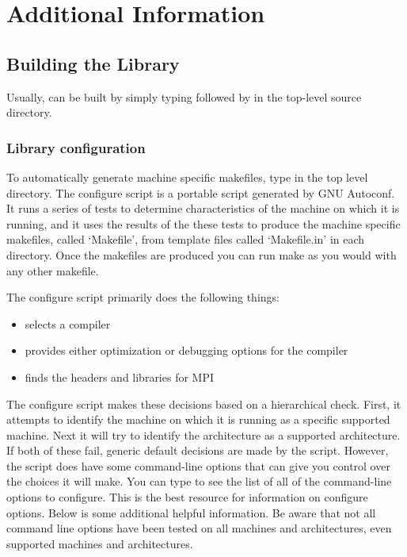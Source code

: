 \chapter{Additional Information}


\section{Building the Library}

Usually, \hypre{} can be built by simply typing 
followed by  in the top-level source directory.

\subsection{Library configuration}

To automatically generate machine specific makefiles, type
 in the top level directory.  The configure
script is a portable script generated by GNU Autoconf.  It runs a
series of tests to determine characteristics of the machine on which
it is running, and it uses the results of the these tests to produce
the machine specific makefiles, called `Makefile', from template files
called `Makefile.in' in each directory.  Once the makefiles are
produced you can run make as you would with any other makefile.

The configure script primarily does the following things:
\begin{itemize}
\item selects a compiler
\item provides either optimization or debugging options for the compiler
\item finds the headers and libraries for MPI
\end{itemize}

The configure script makes these decisions based on a hierarchical
check.  First, it attempts to identify the machine on which it is
running as a specific supported machine.  Next it will try to identify
the architecture as a supported architecture.  If both of these fail,
generic default decisions are made by the script.  However, the script
does have some command-line options that can give you control over the
choices it will make.  You can type  to see the
list of all of the command-line options to configure. This is the best
resource for information on configure options.  Below is some
additional helpful information.  Be aware that not all command line
options have been tested on all machines and architectures, even
supported machines and architectures.


